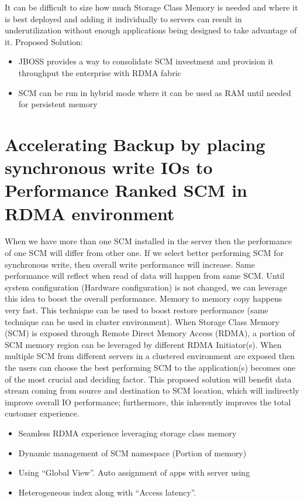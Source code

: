 \documentclass{article}
\begin{document}
It can be difficult to size how much Storage Class Memory is needed and where it is best deployed and adding it individually to servers can result in underutilization without enough applications being designed to take advantage of it. Proposed Solution:
\begin{itemize} \itemsep 1pt
\item {JBOSS provides a way to consolidate SCM investment and provision it throughput the enterprise with RDMA fabric }  
\item {SCM can be run in hybrid mode where it can be used as RAM until needed for persistent memory}  
\end{itemize}


\section{Accelerating Backup by placing synchronous write IOs to Performance Ranked SCM in RDMA environment}

When we have more than one SCM installed in the server then the performance of one SCM will differ from other one. If we select better performing SCM for synchronous write, then overall write performance will increase. Same performance will reflect when read of data will happen from same SCM. Until system configuration (Hardware configuration) is not changed, we can leverage this idea to boost the overall performance.  
Memory to memory copy happens very fast. This technique can be used to boost restore performance (same technique can be used in cluster environment). When Storage Class Memory (SCM) is exposed through Remote Direct Memory Access (RDMA), a portion of SCM memory region can be leveraged by different RDMA Initiator(s). When multiple SCM from different servers in a clustered environment are exposed then the users can choose the best performing SCM to the application(s) becomes one of the most crucial and deciding factor.
This proposed solution will benefit data stream coming from source and destination to SCM location, which will indirectly improve overall IO performance; furthermore, this inherently improves the total customer experience. 
 

\begin{itemize} \itemsep 1pt

\item {Seamless RDMA experience leveraging storage class memory}  

\item {Dynamic management of SCM namespace (Portion of memory) }
\item {Using “Global View”. Auto assignment of apps with server using  }
\item {Heterogeneous index along with “Access latency”. }

\end{itemize}
\end{document}
